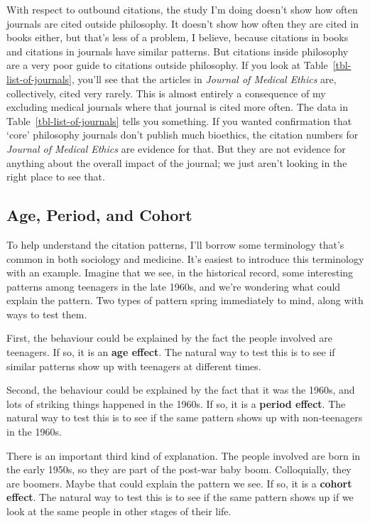 \documentclass[
]{ergoclass}
\begin{document}
With respect to outbound citations, the study I'm doing doesn't show how
often journals are cited outside philosophy. It doesn't show how often
they are cited in books either, but that's less of a problem, I believe,
because citations in books and citations in journals have similar
patterns. But citations inside philosophy are a very poor guide to
citations outside philosophy. If you look at
Table~\ref{tbl-list-of-journals}, you'll see that the articles in
\emph{Journal of Medical Ethics} are, collectively, cited very rarely.
This is almost entirely a consequence of my excluding medical journals
where that journal is cited more often. The data in
Table~\ref{tbl-list-of-journals} tells you something. If you wanted
confirmation that `core' philosophy journals don't publish much
bioethics, the citation numbers for \emph{Journal of Medical Ethics} are
evidence for that. But they are not evidence for anything about the
overall impact of the journal; we just aren't looking in the right place
to see that.

\subsection{Age, Period, and Cohort}\label{sec-apc}

To help understand the citation patterns, I'll borrow some terminology
that's common in both sociology and medicine. It's easiest to introduce
this terminology with an example. Imagine that we see, in the historical
record, some interesting patterns among teenagers in the late 1960s, and
we're wondering what could explain the pattern. Two types of pattern
spring immediately to mind, along with ways to test them.

First, the behaviour could be explained by the fact the people involved
are teenagers. If so, it is an \textbf{age effect}. The natural way to
test this is to see if similar patterns show up with teenagers at
different times.

Second, the behaviour could be explained by the fact that it was the
1960s, and lots of striking things happened in the 1960s. If so, it is a
\textbf{period effect}. The natural way to test this is to see if the
same pattern shows up with non-teenagers in the 1960s.

There is an important third kind of explanation. The people involved are
born in the early 1950s, so they are part of the post-war baby boom.
Colloquially, they are boomers. Maybe that could explain the pattern we
see. If so, it is a \textbf{cohort effect}. The natural way to test this
is to see if the same pattern shows up if we look at the same people in
other stages of their life.
\end{document}
